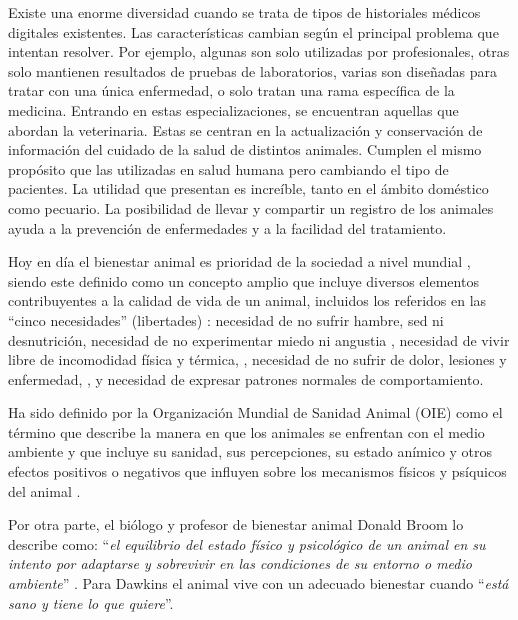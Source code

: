 Existe una enorme diversidad cuando se trata de tipos de historiales m\'edicos digitales existentes. Las caracter\'isticas cambian seg\'un el principal problema que intentan resolver. Por ejemplo, algunas son solo utilizadas por profesionales, otras solo mantienen resultados de pruebas de laboratorios, varias son diseñadas para tratar con una \'unica enfermedad, o solo tratan una rama espec\'ifica de la medicina. Entrando en estas especializaciones, se encuentran aquellas que abordan la veterinaria. Estas se centran en la actualización y conservación de informaci\'on del cuidado de la salud de distintos animales. Cumplen el mismo prop\'osito que las utilizadas en salud humana pero cambiando el tipo de pacientes. La utilidad que presentan es incre\'ible, tanto en el \'ambito dom\'estico como pecuario. La posibilidad de llevar y compartir un registro de los animales ayuda a la prevenci\'on de enfermedades y a la facilidad del tratamiento. 
\newline

Hoy en día el bienestar animal es prioridad de la sociedad a nivel mundial , siendo este definido como un concepto amplio que incluye diversos elementos  contribuyentes a la calidad de vida de un animal, incluidos los referidos en las “cinco necesidades” (libertades) : necesidad de no sufrir hambre, sed ni desnutrición, necesidad de no experimentar miedo ni angustia
, necesidad de vivir libre de incomodidad física y térmica,
, necesidad de no sufrir de dolor, lesiones y enfermedad,
, y necesidad de expresar patrones normales de comportamiento.


Ha sido definido por la Organización Mundial de Sanidad Animal (OIE) como el término que describe la manera en que los animales se enfrentan con el medio ambiente y que incluye su sanidad, sus percepciones, su estado anímico y otros efectos positivos o negativos que influyen sobre los mecanismos físicos y psíquicos del animal .

Por otra parte, el biólogo y profesor de bienestar animal Donald Broom lo describe como: “\textit{el equilibrio del estado físico y psicológico de un animal en su intento por adaptarse y sobrevivir en las condiciones de su entorno o medio ambiente}” . Para Dawkins  el animal vive con un adecuado bienestar cuando “\textit{está sano y tiene lo que quiere}”.

